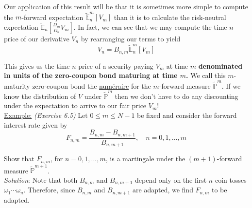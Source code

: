 \documentclass[12pt]{article}
\newlength\tindent
\renewcommand{\indent}{\hspace*{\tindent}}
\renewcommand{\P}{\mathbb P}
\newcommand{\E}{\mathbb E}
\begin{document}
\indent Our application of this result will be that it is sometimes more simple to compute the $m$-forward expectation $\tilde{\E}^m_n[V_m]$ than it is to calculate the risk-neutral expectation $\tilde{\E}_n \left[ \frac{D_m}{D_n} V_m \right]$. In fact, we can see that we may compute the time-$n$ price of our derivative $V_n$ by rearranging our terms to yield
\begin{equation*}
	V_n = B_{n,m} \tilde{\E}^m_n[V_m]
\end{equation*}

\indent This gives us the time-$n$ price of a security paying $V_m$ at time $m$ {\bf denominated in units of the zero-coupon bond maturing at time $m$.} We call this $m$-maturity zero-coupon bond the \underline{num{\'e}raire} for the $m$-forward measure $\tilde{\P}^m$. If we know the distribution of $V$ under $\tilde{\P}^m$ then we don't have to do any discounting under the expectation to arrive to our fair price $V_m$! \\

\underline{Example:} {\em (Exercise 6.5)} Let $0 \leq m \leq N - 1$ be fixed and consider the forward interest rate given by
\begin{equation*}
	F_{n,m} = \frac{ B_{n,m} - B_{n,m + 1} }{ B_{n,m + 1} }, \quad n = 0,1,...,m
\end{equation*}

\indent Show that $F_{n,m}$, for $n = 0,1,...,m$, is a martingale under the $(m + 1)$-forward measure $\tilde{\P}^{m + 1}$. \\

{\em Solution}: Note that both $B_{n,m}$ and $B_{n,m + 1}$ depend only on the first $n$ coin tosses $\omega_1\cdots\omega_n$. Therefore, since $B_{n,m}$ and $B_{n,m + 1}$ are adapted, we find $F_{n,m}$ to be adapted. \\
\end{document}
